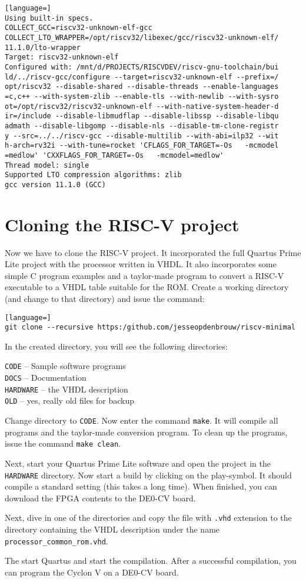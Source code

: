 \documentclass[12pt]{article}
\begin{document}
\begin{enumerate}
\begin{lstlisting}[language=]
Using built-in specs.
COLLECT_GCC=riscv32-unknown-elf-gcc
COLLECT_LTO_WRAPPER=/opt/riscv32/libexec/gcc/riscv32-unknown-elf/
11.1.0/lto-wrapper
Target: riscv32-unknown-elf
Configured with: /mnt/d/PROJECTS/RISCVDEV/riscv-gnu-toolchain/bui
ld/../riscv-gcc/configure --target=riscv32-unknown-elf --prefix=/
opt/riscv32 --disable-shared --disable-threads --enable-languages
=c,c++ --with-system-zlib --enable-tls --with-newlib --with-sysro
ot=/opt/riscv32/riscv32-unknown-elf --with-native-system-header-d
ir=/include --disable-libmudflap --disable-libssp --disable-libqu
admath --disable-libgomp --disable-nls --disable-tm-clone-registr
y --src=../../riscv-gcc --disable-multilib --with-abi=ilp32 --wit
h-arch=rv32i --with-tune=rocket 'CFLAGS_FOR_TARGET=-Os   -mcmodel
=medlow' 'CXXFLAGS_FOR_TARGET=-Os   -mcmodel=medlow'
Thread model: single
Supported LTO compression algorithms: zlib
gcc version 11.1.0 (GCC) 
\end{lstlisting}
\end{enumerate}

\section{Cloning the RISC-V project}
Now we have to clone the RISC-V project. It incorporated the full Quartus Prime Lite project with the processor written in VHDL. It also incorporates some simple C program examples and a taylor-made program to convert a RISC-V executable to a VHDL table suitable for the ROM. Create a working directory (and change to that directory) and issue the command:

\begin{lstlisting}[language=]
git clone --recursive https:/github.com/jesseopdenbrouw/riscv-minimal
\end{lstlisting}

In the created directory, you will see the following directories:

\texttt{CODE} -- Sample software programs\\
\texttt{DOCS} -- Documentation\\
\texttt{HARDWARE} -- the VHDL description \\
\texttt{OLD} -- yes, really old files for backup

Change directory to \texttt{CODE}. Now enter the command \texttt{make}. It will compile all programs and the taylor-made conversion program. To clean up the programs, issue the command \texttt{make clean}.

Next, start your Quartus Prime Lite software and open the project in the \texttt{HARDWARE} directory. Now start a build by clicking on the play-symbol. It should compile a standard setting (this takes a long time). When finished, you can download the FPGA contents to the DE0-CV board.

Next, dive in one of the directories and copy the file with \texttt{.vhd} extension to the directory containing the VHDL description under the name \texttt{processor\_common\_rom.vhd}.

The start Quartus and start the compilation. After a successful compilation, you can program the Cyclon V on a DE0-CV board.
\end{document}
